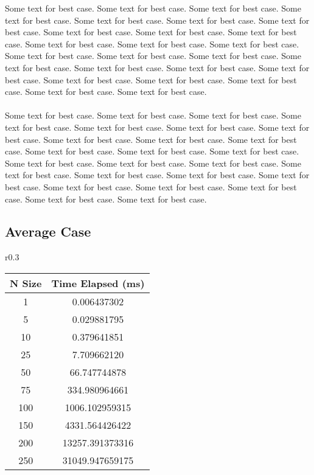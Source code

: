 \documentclass[10pt]{article}
\begin{document}
\indent \indent Some text for best case. Some text for best case. Some text for best case. Some text for best case. Some text for best case. Some text for best case. Some text for best case. Some text for best case. Some text for best case. Some text for best case. Some text for best case. Some text for best case. Some text for best case. Some text for best case. Some text for best case. Some text for best case. Some text for best case. Some text for best case. Some text for best case. Some text for best case. Some text for best case. Some text for best case. Some text for best case. Some text for best case. Some text for best case.  
\\\\
\indent Some text for best case. Some text for best case. Some text for best case. Some text for best case. Some text for best case. Some text for best case. Some text for best case. Some text for best case. Some text for best case. Some text for best case. Some text for best case. Some text for best case. Some text for best case. Some text for best case. Some text for best case. Some text for best case. Some text for best case. Some text for best case. Some text for best case. Some text for best case. Some text for best case. Some text for best case. Some text for best case. Some text for best case. Some text for best case.   


\newpage
\subsection{Average Case}
\begin{wraptable}{r}{0.3\textwidth}
\centering
\begin{tabular}{|c|c|} 
 \hline
 N Size & Time Elapsed (ms) \\ 
 \hline
 1 & 0.006437302 \\
 \hline
 5 & 0.029881795 \\
 \hline
 10 & 0.379641851 \\
 \hline
 25 & 7.709662120 \\
 \hline
 50 & 66.747744878 \\
 \hline
 75 & 334.980964661 \\
 \hline
 100 & 1006.102959315 \\
 \hline
 150 & 4331.564426422 \\
 \hline
 200 & 13257.391373316 \\
 \hline
 250 & 31049.947659175 \\
 \hline
\end{tabular}
\end{wraptable}
\end{document}
